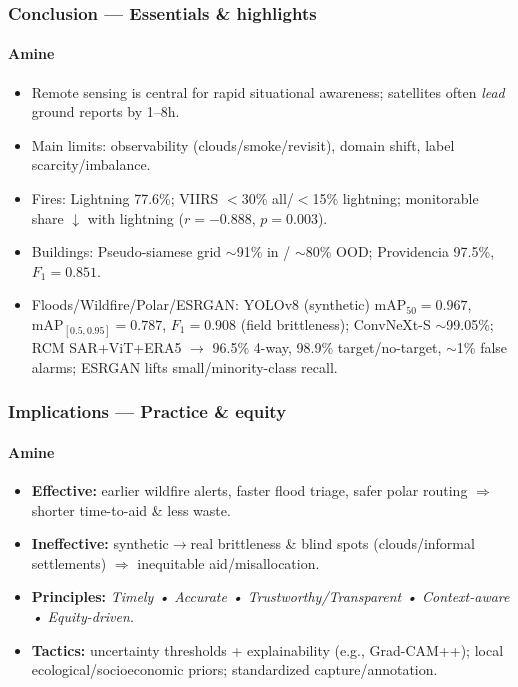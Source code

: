 \documentclass{beamer}
\newcommand{\namedframe}[3]{
  \begin{frame}
    \frametitle{#2}
    \framesubtitle{#1}
    #3
  \end{frame}
}
\begin{document}
\namedframe{Amine}{Conclusion — Essentials \& highlights}{
\footnotesize
\begin{itemize}
  \item Remote sensing is central for rapid situational awareness; satellites often \emph{lead} ground reports by 1–8h.
  \item Main limits: observability (clouds/smoke/revisit), domain shift, label scarcity/imbalance.
  \item Fires: Lightning 77.6\%; VIIRS $<$30\% all/$<$15\% lightning; monitorable share $\downarrow$ with lightning ($r=-0.888$, $p=0.003$).
  \item Buildings: Pseudo-siamese grid $\sim$91\% in / $\sim$80\% OOD; Providencia 97.5\%, $F_1=0.851$.
  \item Floods/Wildfire/Polar/ESRGAN: YOLOv8 (synthetic) $\mathrm{mAP}_{50}=0.967$, $\mathrm{mAP}_{[0.5,0.95]}=0.787$, $F_1=0.908$ (field brittleness); ConvNeXt-S $\sim$99.05\%; RCM SAR+ViT+ERA5 $\rightarrow$ 96.5\% 4-way, 98.9\% target/no-target, $\sim$1\% false alarms; ESRGAN lifts small/minority-class recall.
\end{itemize}
}

\namedframe{Amine}{Implications — Practice \& equity}{
\footnotesize
\begin{itemize}
  \item \textbf{Effective:} earlier wildfire alerts, faster flood triage, safer polar routing $\Rightarrow$ shorter time-to-aid \& less waste.
  \item \textbf{Ineffective:} synthetic$\to$real brittleness \& blind spots (clouds/informal settlements) $\Rightarrow$ inequitable aid/misallocation.
  \item \textbf{Principles:} \emph{Timely • Accurate • Trustworthy/Transparent • Context-aware • Equity-driven}.
  \item \textbf{Tactics:} uncertainty thresholds + explainability (e.g., Grad-CAM++); local ecological/socioeconomic priors; standardized capture/annotation.
\end{itemize}
}
\end{document}
